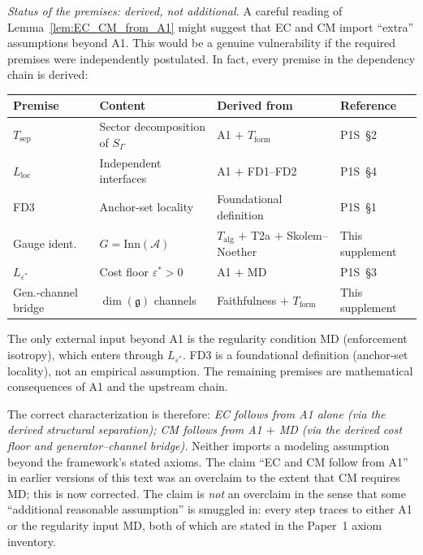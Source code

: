 \documentclass[11pt,a4paper]{article}
\theoremstyle{definition}
\begin{document}
\noindent\textit{Status of the premises: derived, not additional.}\quad
A careful reading of Lemma~\ref{lem:EC_CM_from_A1} might suggest that
EC and CM import ``extra'' assumptions beyond A1.  This would be a
genuine vulnerability if the required premises were independently
postulated.  In fact, every premise in the dependency chain is derived:
\begin{center}\small
\renewcommand{\arraystretch}{1.15}
\begin{tabular}{@{}p{3.0cm}p{3.5cm}p{3.5cm}p{2.5cm}@{}}
\toprule
\textbf{Premise} & \textbf{Content} & \textbf{Derived from} & \textbf{Reference} \\
\midrule
$T_{\mathrm{sep}}$ & Sector decomposition of $S_\Gamma$ &
  A1 $+$ $T_{\mathrm{form}}$ & P1S~\S2 \\
$L_{\mathrm{loc}}$ & Independent interfaces &
  A1 $+$ FD1--FD2 & P1S~\S4 \\
FD3 & Anchor-set locality &
  Foundational definition & P1S~\S1 \\
Gauge ident. & $G = \mathrm{Inn}(\mathcal{A})$ &
  $T_{\mathrm{alg}}$ $+$ T2a $+$ Skolem--Noether & This supplement \\
$L_{\varepsilon^*}$ & Cost floor $\varepsilon^* > 0$ &
  A1 $+$ MD & P1S~\S3 \\
Gen.-channel bridge & $\dim(\mathfrak{g})$ channels &
  Faithfulness $+$ $T_{\mathrm{form}}$ & This supplement \\
\bottomrule
\end{tabular}
\end{center}
\noindent The only external input beyond A1 is the regularity
condition MD (enforcement isotropy), which enters through
$L_{\varepsilon^*}$.  FD3 is a foundational definition (anchor-set
locality), not an empirical assumption.  The remaining premises are
mathematical consequences of A1 and the upstream chain.

The correct characterization is therefore: \emph{EC follows from A1
alone (via the derived structural separation); CM follows from A1 $+$
MD (via the derived cost floor and generator--channel bridge).}
Neither imports a modeling assumption beyond the framework's stated
axioms.  The claim ``EC and CM follow from A1'' in earlier versions
of this text was an overclaim to the extent that CM requires MD; this
is now corrected.  The claim is \emph{not} an overclaim in the sense
that some ``additional reasonable assumption'' is smuggled in: every
step traces to either A1 or the regularity input MD, both of which
are stated in the Paper~1 axiom inventory.
\end{document}
